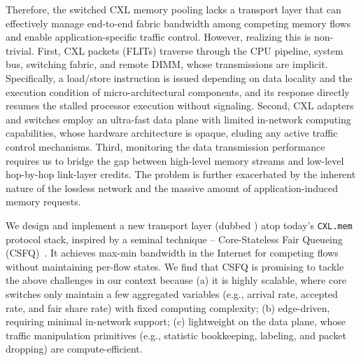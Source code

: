 
Therefore, the switched CXL memory pooling lacks a transport layer that can effectively manage end-to-end fabric bandwidth among competing memory flows and enable application-specific traffic control.
However, realizing this is non-trivial. First, CXL packets (FLITs) traverse through the CPU pipeline, system bus, switching fabric, and remote DIMM, whose transmissions are implicit. Specifically, a load/store instruction is issued depending on data locality and the execution condition of micro-architectural components, and its response directly resumes the stalled processor execution without signaling. Second, CXL adapters and switches employ an ultra-fast data plane with limited in-network computing capabilities, whose hardware architecture is opaque, eluding any active traffic control mechanisms. Third, monitoring the data transmission performance requires us to bridge the gap between high-level memory streams and low-level hop-by-hop link-layer credits. The problem is further exacerbated by the inherent nature of the lossless network and the massive amount of application-induced memory requests.

We design and implement a new transport layer (dubbed {\bf \sys}) atop today's \texttt{CXL.mem} protocol stack, inspired by a seminal technique -- Core-Stateless Fair Queueing (CSFQ)~\cite{csfq-sigcomm98}. It achieves max-min bandwidth in the Internet for competing flows without maintaining per-flow states. We find that CSFQ is promising to tackle the above challenges in our context because (a) it is highly scalable, where core switches only maintain a few aggregated variables (e.g., arrival rate, accepted rate, and fair share rate) with fixed computing complexity;  (b) edge-driven, requiring minimal in-network support; (c) lightweight on the data plane,  whose traffic manipulation primitives (e.g., statistic bookkeeping, labeling, and packet dropping) are compute-efficient.

